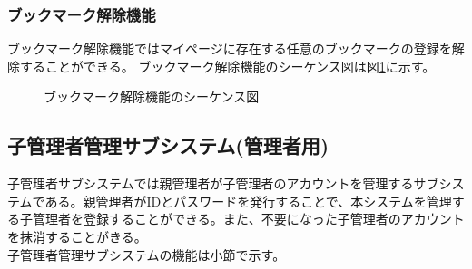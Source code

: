 \documentclass[a4j]{jarticle}
\begin{document}
  \subsubsection{ブックマーク解除機能}
  ブックマーク解除機能ではマイページに存在する任意のブックマークの登録を解除することができる。
  ブックマーク解除機能のシーケンス図は図\ref{fig:bookmark_release.png}に示す。
  \begin{figure}[H]
    \centering
    \caption{ブックマーク解除機能のシーケンス図}
    \label{fig:bookmark_release.png}
  \end{figure}



  \subsection{子管理者管理サブシステム(管理者用)}
  子管理者サブシステムでは親管理者が子管理者のアカウントを管理するサブシステムである。親管理者がIDとパスワードを発行することで、本システムを管理する子管理者を登録することができる。また、不要になった子管理者のアカウントを抹消することがきる。\\
  子管理者管理サブシステムの機能は小節で示す。
\end{document}

